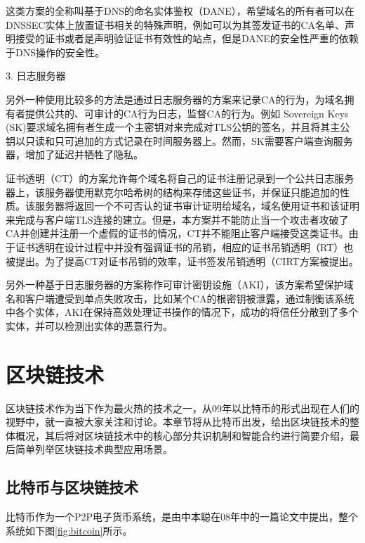 这类方案的全称叫基于DNS的命名实体鉴权（DANE）\cite{schlyter2012dns}，希望域名的所有者可以在DNSSEC实体上放置证书相关的特殊声明，例如可以为其签发证书的CA名单、声明接受的证书或者是声明验证证书有效性的站点，但是DANE的安全性严重的依赖于DNS操作的安全性。


3. 日志服务器

另外一种使用比较多的方法是通过日志服务器的方案来记录CA的行为，为域名拥有者提供公共的、可审计的CA行为日志，监督CA的行为。例如 Sovereign Keys (SK)\cite{eckersleysovereign}要求域名拥有者生成一个主密钥对来完成对TLS公钥的签名，并且将其主公钥以只读和只可追加的方式记录在时间服务器上。然而，SK需要客户端查询服务器，增加了延迟并牺牲了隐私。

证书透明（CT）\cite{laurie2013certificate}的方案允许每个域名将自己的证书注册记录到一个公共日志服务器上，该服务器使用默克尔哈希树的结构来存储这些证书，并保证只能追加的性质。该服务器将返回一个不可否认的证书审计证明给域名，域名使用证书和该证明来完成与客户端TLS连接的建立。但是，本方案并不能防止当一个攻击者攻破了CA并创建并注册一个虚假的证书的情况，CT并不能阻止客户端接受这类证书。由于证书透明在设计过程中并没有强调证书的吊销，相应的证书吊销透明（RT）\cite{laurie2012revocation}也被提出。为了提高CT对证书吊销的效率，证书签发吊销透明（CIRT\cite{ryan2014enhanced}方案被提出。

另外一种基于日志服务器的方案称作可审计密钥设施（AKI）\cite{kim2013accountable}，该方案希望保护域名和客户端遭受到单点失败攻击，比如某个CA的根密钥被泄露，通过制衡该系统中各个实体，AKI在保持高效处理证书操作的情况下，成功的将信任分散到了多个实体，并可以检测出实体的恶意行为。






\section{区块链技术}




区块链技术作为当下作为最火热的技术之一，从09年以比特币的形式出现在人们的视野中，就一直被大家关注和讨论。本章节将从比特币出发，给出区块链技术的整体概况，其后将对区块链技术中的核心部分共识机制和智能合约进行简要介绍，最后简单列举区块链技术典型应用场景。

\subsection{比特币与区块链技术}


比特币作为一个P2P电子货币系统，是由中本聪在08年中的一篇论文中提出\cite{nakamoto2008bitcoin}，整个系统如下图\ref{fig:bitcoin}所示。

